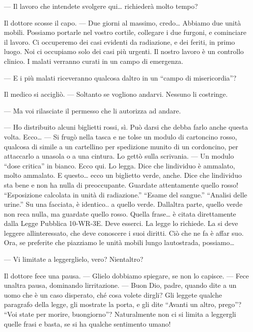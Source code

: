 --- Il lavoro che intendete svolgere qui\ldots{} richiederà molto tempo?

Il dottore scosse il capo. --- Due giorni al massimo, credo\ldots{}
Abbiamo due unità mobili. Possiamo portarle nel vostro cortile,
collegare i due furgoni, e cominciare il lavoro. Ci occuperemo dei casi
evidenti da radiazione, e dei feriti, in primo luogo. Noi ci occupiamo
solo dei casi più urgenti. Il nostro lavoro è un controllo clinico. I
malati verranno curati in un campo di emergenza.

--- E i più malati riceveranno qualcosa d\textquotesingle altro in un
``campo di misericordia''?

Il medico si accigliò. --- Soltanto se vogliono andarvi. Nessuno li
costringe.

--- Ma voi rilasciate il permesso che li autorizza ad andare.

--- Ho distribuito alcuni biglietti rossi, sì. Può darsi che debba farlo
anche questa volta. Ecco\ldots{} --- Si frugò nella tasca e ne tolse un
modulo di cartoncino rosso, qualcosa di simile a un cartellino per
spedizione munito di un cordoncino, per attaccarlo a
un\textquotesingle asola o a una cintura. Lo gettò sulla scrivania. ---
Un modulo ``dose critica'' in bianco. Ecco qui. Lo legga. Dice che
l\textquotesingle individuo è ammalato, molto ammalato. E questo\ldots{}
ecco un biglietto verde, anche. Dice che l\textquotesingle individuo sta
bene e non ha nulla di preoccupante. Guardate attentamente quello rosso!
``Esposizione calcolata in unità di radiazione.'' ``Esame del sangue.''
``Analisi delle urine.'' Su una facciata, è identico.. a quello verde.
Dall\textquotesingle altra parte, quello verde non reca nulla, ma
guardate quello rosso. Quella frase\ldots{} è citata direttamente dalla
Legge Pubblica 10-WR-3E. Deve esserci. La legge lo richiede. La si deve
leggere all\textquotesingle interessato, che deve conoscere i suoi
diritti. Ciò che ne fa è affar suo. Ora, se preferite che piazziamo le
unità mobili lungo l\textquotesingle autostrada, possiamo\ldots{}

--- Vi limitate a leggerglielo, vero? Nient\textquotesingle altro?

Il dottore fece una pausa. --- Glielo dobbiamo spiegare, se non lo
capisce. --- Fece un\textquotesingle altra pausa, dominando
l\textquotesingle irritazione. --- Buon Dio, padre, quando dite a un
uomo che è un caso disperato, ché cosa volete dirgli? Gli leggete
qualche paragrafo della legge, gli mostrate la porta, e gli dite
``Avanti un altro, prego''? ``Voi state per morire, buongiorno''?
Naturalmente non ci si limita a leggergli quelle frasi e basta, se si ha
qualche sentimento umano!

